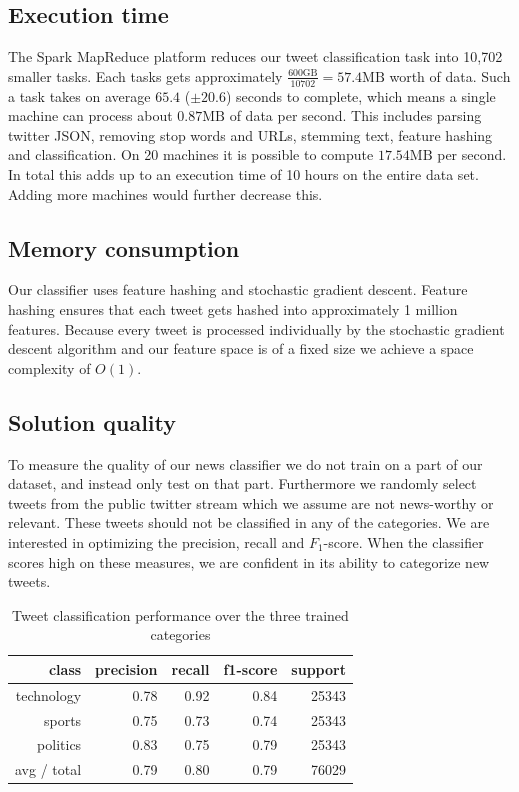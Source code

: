 \documentclass{llncs}
\begin{document}
\subsection{Execution time}
The Spark MapReduce platform reduces our tweet classification task into 10,702 smaller tasks. Each tasks gets approximately $\frac{600\text{GB}}{10702} = 57.4\text{MB}$ worth of data. Such a task takes on average $65.4$ ($\pm 20.6$) seconds to complete, which means a single machine can process about $0.87\text{MB}$ of data per second. This includes parsing twitter JSON, removing stop words and URLs, stemming text, feature hashing and classification. On 20 machines it is possible to compute $17.54\text{MB}$ per second. In total this adds up to an execution time of 10 hours on the entire data set. Adding more machines would further decrease this.

\subsection{Memory consumption}
Our classifier uses feature hashing and stochastic gradient descent. Feature hashing ensures that each tweet gets hashed into approximately 1 million features. Because every tweet is processed individually by the stochastic gradient descent algorithm and our feature space is of a fixed size we achieve a space complexity of $O(1)$.

\subsection{Solution quality}
To measure the quality of our news classifier we do not train on a part of our dataset, and instead only test on that part. Furthermore we randomly select tweets from the public twitter stream which we assume are not news-worthy or relevant. These tweets should not be classified in any of the categories. We are interested in optimizing the precision, recall and $F_1$-score. When the classifier scores high on these measures, we are confident in its ability to categorize new tweets.

\begin{table}
	\begin{center}
		\begin{tabular}{|r|r|r|r|r|} \hline
			class  & precision   & recall & f1-score  & support \\ \hline
			technology    &   0.78 &     0.92  &    0.84   &  25343 \\
			sports   &    0.75   &   0.73   &   0.74   &   25343 \\
			politics   &    0.83  &    0.75   &   0.79   &   25343 \\
			avg / total  &     0.79   &   0.80  &    0.79   &  76029 \\ \hline
		\end{tabular}
	\end{center}
	\caption{Tweet classification performance over the three trained categories}
	\label{tbl:newclassifier}
\end{table}
\end{document}
